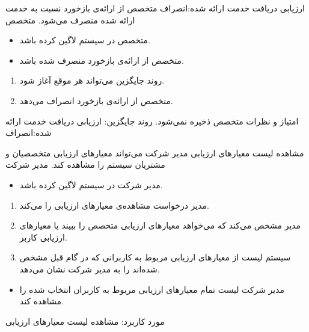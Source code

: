 \alternativeflow
{
	ارزیابی دریافت خدمت ارائه شده:انصراف
}
{}
{
	متخصص از ارائه‌ی بازخورد نسبت به خدمت ارائه شده منصرف می‌شود.
}
{
	متخصص
}
{}
{
	\begin{itemize}
		\vspace*{-0.6cm}
		\item 
		متخصص در سیستم لاگین کرده باشد.
		\item
		متخصص از ارائه‌ی بازخورد منصرف شده باشد.
	\end{itemize}
}
{
	\vspace*{-0.6cm}
	\begin{enumerate}
		\item 
		روند جایگزین می‌تواند هر موقع آغاز شود.
		\item
		متخصص از ارائه‌ی بازخورد انصراف می‌دهد.
	\end{enumerate}
}
{
	امتیاز و نظرات متخصص ذخیره نمی‌شود.
}
{
	روند جایگزین: ارزیابی دریافت خدمت ارائه شده:انصراف
}


\usecase
{
مشاهده لیست معیارهای ارزیابی
}
{
}
{
مدیر شرکت می‌تواند معیارهای ارزیابی متخصصیان و مشتریان سیستم را مشاهده کند.
}
{
مدیر شرکت
}
{
}
{
	\begin{itemize}
	\vspace*{-0.6cm}
	\item 
	مدیر شرکت در سیستم لاگین کرده باشد.
\end{itemize}
}
{
	\vspace*{-0.6cm}
	\begin{enumerate}
		\item 
		مدیر درخواست مشاهده‌ی معیارهای ارزیابی را می‌کند.
		\item
	مدیر مشخص می‌کند که می‌خواهد معیارهای ارزیابی متخصص را ببیند یا معیارهای ارزیابی کاربر.
	\item 
	سیستم لیست از معیارهای ارزیابی مربوط به کاربرانی که در گام قبل مشخص شده‌اند را به مدیر شرکت نشان می‌دهد.
	\end{enumerate}
}
{
	\begin{itemize}
	\vspace*{-0.6cm}
	\item 
مدیر شرکت لیست تمام معیارهای ارزیابی مربوط به کاربران انتخاب شده را مشاهده کند.
\end{itemize}
}
{
}
{
	مورد کاربرد: مشاهده لیست معیارهای ارزیابی
}



